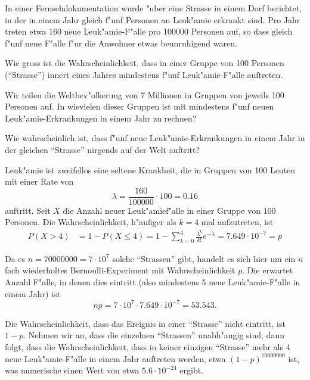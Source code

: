 In einer Fernsehdokumentation wurde "uber eine Strasse in einem Dorf berichtet,
in der in einem Jahr gleich f"unf Personen an Leuk"amie erkrankt sind.
Pro Jahr treten etwa 160 neue Leuk"amie-F"alle pro 100000 Personen auf,
so dass gleich f"unf neue F"alle f"ur die Anwohner etwas beunruhigend
waren.
\begin{teilaufgaben}
\item
Wie gross ist die Wahrscheinlichkeit, dass in einer Gruppe von
100 Personen (``Strasse'') innert eines Jahres mindestens f"unf
Leuk"amie-F"alle auftreten.
\item
Wir teilen die Weltbev"olkerung von 7 Millionen in Gruppen von jeweils 100
Personen auf.
In wievielen dieser Gruppen ist mit mindestens f"unf neuen
Leuk"amie-Erkrankungen in einem Jahr zu rechnen?
\item
Wie wahrscheinlich ist, dass f"unf neue Leuk"amie-Erkrankungen in einem 
Jahr in der gleichen ``Strasse'' nirgends auf der Welt auftritt?
\end{teilaufgaben}

\begin{loesung}
\begin{teilaufgaben}
\item
Leuk"amie ist zweifellos eine seltene Krankheit, die in Gruppen von 
100 Leuten mit einer Rate von 
\[
\lambda = \frac{160}{100000}\cdot 100=0.16
\]
auftritt.
Seit $X$ die Anzahl neuer Leuk"amief"alle in einer Gruppe von $100$
Personen.
Die Wahrscheinlichkeit, h"aufiger als $k=4$ mal aufzutreten, ist
\begin{align*}
P(X>4)
&=
1-P(X\le 4)
=
1-\sum_{k=0}^4 \frac{\lambda^k}{k!}e^{-\lambda}
=
7.649\cdot10^{-7}=p
\end{align*}
\item
Da es $n=70000000=7\cdot 10^7$ solche ``Strassen'' gibt, handelt es sich hier um
ein $n$ fach wiederholtes Bernoulli-Experiment mit Wahrscheinlichkeit $p$.
Die erwartet Anzahl F"alle, in denen dies eintritt (also mindestens 5
neue Leuk"amie-F"alle in einem Jahr) ist
\[
np=7\cdot 10^7\cdot 7.649\cdot 10^{-7}=53.543.
\]
\item
Die Wahrscheinlichkeit, dass das Ereignis in einer ``Strasse'' nicht eintritt,
ist $1-p$.
Nehmen wir an, dass die einzelnen ``Strassen'' unabh"angig sind, dann
folgt, dass die Wahrscheinlichkeit, dass in keiner einzigen ``Strasse''
mehr als 4 neue Leuk"amie-F"alle in einem Jahr auftreten werden, 
etwa $(1-p)^70000000$ ist, was numerische einen Wert von etwa
$5.6\cdot 10^{-24}$ ergibt.
\end{teilaufgaben}
\end{loesung}

\begin{bewertung}
\end{bewertung}



